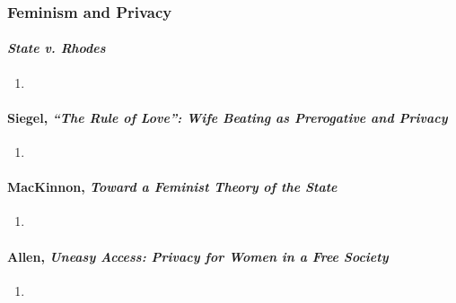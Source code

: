 \subsubsection{Feminism and Privacy}

\paragraph{\emph{State v. Rhodes}}

\begin{enumerate}
    \item %
\end{enumerate}

\paragraph{Siegel, \emph{``The Rule of Love'': Wife Beating as Prerogative and 
Privacy}}

\begin{enumerate}
    \item %
\end{enumerate}

\paragraph{MacKinnon, \emph{Toward a Feminist Theory of the State}}

\begin{enumerate}
    \item %
\end{enumerate}

\paragraph{Allen, \emph{Uneasy Access: Privacy for Women in a Free Society}}

\begin{enumerate}
    \item %
\end{enumerate}
